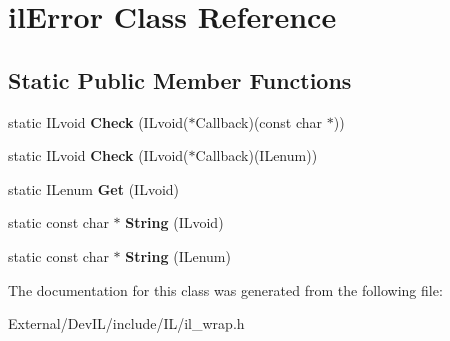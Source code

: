 \hypertarget{classilError}{
\section{ilError Class Reference}
\label{classilError}
}
\subsection*{Static Public Member Functions}
\begin{DoxyCompactItemize}
\item 
\hypertarget{classilError_a13f846787d3805ce416474d130d5783a}{
static ILvoid {\bfseries Check} (ILvoid($\ast$Callback)(const char $\ast$))}
\label{classilError_a13f846787d3805ce416474d130d5783a}

\item 
\hypertarget{classilError_a6bd14a9274a0d11e2ca7d3ef4c692143}{
static ILvoid {\bfseries Check} (ILvoid($\ast$Callback)(ILenum))}
\label{classilError_a6bd14a9274a0d11e2ca7d3ef4c692143}

\item 
\hypertarget{classilError_a183edf64ef773c5a52e241b50bec3d11}{
static ILenum {\bfseries Get} (ILvoid)}
\label{classilError_a183edf64ef773c5a52e241b50bec3d11}

\item 
\hypertarget{classilError_a9f0f0264ed41f5f1b14820d3085e2d87}{
static const char $\ast$ {\bfseries String} (ILvoid)}
\label{classilError_a9f0f0264ed41f5f1b14820d3085e2d87}

\item 
\hypertarget{classilError_a34ea6adf752c57d85d607eefec2b58c8}{
static const char $\ast$ {\bfseries String} (ILenum)}
\label{classilError_a34ea6adf752c57d85d607eefec2b58c8}

\end{DoxyCompactItemize}


The documentation for this class was generated from the following file:\begin{DoxyCompactItemize}
\item 
External/DevIL/include/IL/il\_\-wrap.h\end{DoxyCompactItemize}
